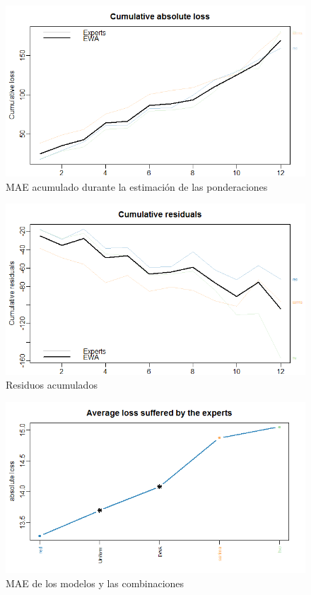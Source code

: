 \documentclass[12pt,a4paper,oneside]{article}
\begin{document}
\begin{figure} [h]
    \centering
    \centerline{\includegraphics[scale = 0.7]{Images/3.png}}
    \caption{MAE acumulado durante la estimación de las ponderaciones}
    \label{red}
\end{figure}
\vspace*{3\baselineskip}
\vspace*{3\baselineskip}
\vspace*{3\baselineskip}
\begin{figure} [h]
    \centering
    \centerline{\includegraphics[scale = 0.7]{Images/4.png}}
    \caption{Residuos acumulados}
    \label{red}
\end{figure}
\begin{figure} [h]
    \centering
    \centerline{\includegraphics[scale = 0.7]{Images/5.png}}
    \caption{MAE de los modelos y las combinaciones}
    \label{red}
\end{figure}
\end{document}
